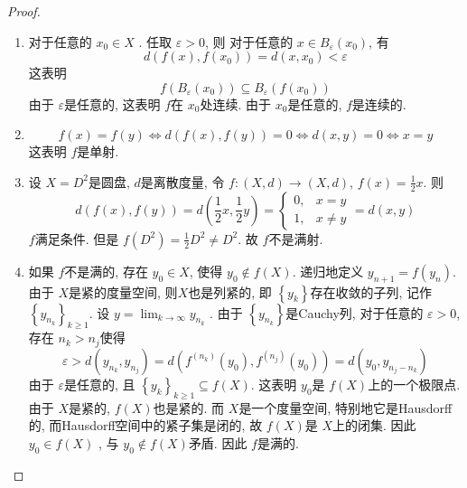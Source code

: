 \documentclass[../main.tex]{subfiles}
\begin{document}
\begin{proof}
    \begin{enumerate}
        \item 对于任意的 \(  x_0\in X \) . 任取 \(   \varepsilon > 0  \), 则 对于任意的 \( x \in B_{ \varepsilon }\left( x_0 \right)   \), 有 \[
    d\left( f\left( x \right),f\left( x_0 \right)    \right)= d\left( x,x_0\right)<  \varepsilon   
    \]这表明 \[
    f\left( B_{ \varepsilon }\left( x_0\right)  \right)\subseteq B_{ \varepsilon }\left( f\left( x_0 \right)  \right)  
    \]由于 \(   \varepsilon   \)是任意的, 这表明 \(  f  \)在 \(  x_0  \)处连续.    由于 \(  x_0  \)是任意的, \(  f  \)是连续的.
    \item  \[
    f\left( x \right)= f\left( y \right)\iff d\left( f\left( x \right),f\left( y \right)   \right)= 0\iff d\left( x,y \right)= 0\iff x= y    
    \]这表明 \(  f  \)是单射.
    \item  设 \(  X= D^2 \)是圆盘, \(  d  \)是离散度量, 令 \(    f: \left( X,d \right)\to \left( X,d \right)  \), \(  f\left( x \right)= \frac{1 }{2 }x    \). 则 \[
    d\left( f\left( x \right),f\left( y \right)   \right)= d\left( \frac{1 }{2 }x, \frac{1 }{2 }y   \right)= \begin{cases} 0,&x= y\\ 
     1,& x\neq  y   \end{cases}   = d\left( x,y \right) 
    \]     \(  f  \)满足条件. 但是 \(  f\left( D^{2} \right)= \frac{1 }{2 }D^{2}\neq D^{2}    \). 故 \(  f  \)不是满射.
    \item 如果 \(  f  \)不是满的, 存在 \(  y_0 \in X  \), 使得 \(  y_0\not \in f\left( X \right)   \). 递归地定义 \(  y_{n+ 1}= f\left( y_{n} \right)   \). 由于 \(  X  \)是紧的度量空间,  则\(  X  \)也是列紧的, 即 \(  \left\{ y_{k} \right\}  \)存在收敛的子列, 记作 \(  \left\{ y_{n_{k}} \right\}  _{k\ge 1}\). 设 \(  y= \lim_{k\to \infty}y_{n_{k}}  \)      . 由于 \(  \left\{ y_{n_{k}} \right\}  \)是Cauchy列, 对于任意的 \(   \varepsilon > 0  \), 存在  \(  n_{k}> n_{j}  \)使得    \[
     \varepsilon > d\left( y_{n_{k}},y_{n_{j}} \right)= d\left( f^{\left( n_{k} \right) }\left( y_0 \right), f^{\left( n_{j} \right) }\left( y_0 \right)   \right)  = d\left( y_0, y_{n_{j}-n_{k}} \right) 
    \]由于 \(   \varepsilon   \)是任意的, 且 \(  \left\{ y_{k} \right\}_{k\ge 1}\subseteq f\left( X \right)   \).   这表明 \(  y_0  \)是 \(  f\left( X \right)   \)上的一个极限点.  由于 \(  X  \)是紧的,  \(  f\left( X \right)   \)也是紧的. 而 \(  X  \)是一个度量空间, 特别地它是Hausdorff的, 而Hausdorff空间中的紧子集是闭的, 故 \(  f\left( X \right)   \)是 \(  X  \)上的闭集.     因此 \(  y_0\in f\left( X \right)   \)    , 与 \(  y_0\not \in f\left( X \right)   \)矛盾. 因此 \(  f  \)是满的.  
    \end{enumerate}
      
\end{proof}
\end{document}
